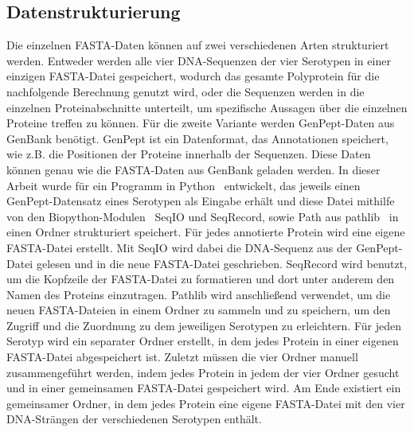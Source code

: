 \documentclass[german,version-2022-01]{uzl-thesis}
\begin{document}
\subsection{Datenstrukturierung}
Die einzelnen FASTA-Daten k\"onnen auf zwei verschiedenen Arten strukturiert werden. Entweder werden alle vier DNA-Sequenzen der vier Serotypen in einer einzigen FASTA-Datei gespeichert, wodurch das gesamte Polyprotein f\"ur die nachfolgende Berechnung genutzt wird, oder die Sequenzen werden in die einzelnen Proteinabschnitte unterteilt, um spezifische Aussagen \"uber die einzelnen Proteine treffen zu k\"onnen. F\"ur die zweite Variante werden GenPept-Daten aus GenBank ben\"otigt. GenPept ist ein Datenformat, das Annotationen speichert, wie z.B. die Positionen der Proteine innerhalb der Sequenzen. Diese Daten k\"onnen genau wie die FASTA-Daten aus GenBank geladen werden. In dieser Arbeit wurde f\"ur ein Programm in Python~\cite{python} entwickelt, das jeweils einen GenPept-Datensatz eines Serotypen als Eingabe erh\"alt und diese Datei mithilfe von den Biopython-Modulen~\cite{cock2009biopython} SeqIO und SeqRecord, sowie Path aus pathlib~\cite{pathlib} in einen Ordner strukturiert speichert. F\"ur jedes annotierte Protein wird eine eigene FASTA-Datei erstellt. Mit SeqIO wird dabei die DNA-Sequenz aus der GenPept-Datei gelesen und in die neue FASTA-Datei geschrieben. SeqRecord wird benutzt, um die Kopfzeile der FASTA-Datei zu formatieren und dort unter anderem den Namen des Proteins einzutragen. Pathlib wird anschlie\ss{}end verwendet, um die neuen FASTA-Dateien in einem Ordner zu sammeln und zu speichern, um den Zugriff und die Zuordnung zu dem jeweiligen Serotypen zu erleichtern. F\"ur jeden Serotyp wird ein separater Ordner erstellt, in dem jedes Protein in einer eigenen FASTA-Datei abgespeichert ist. Zuletzt m\"ussen die vier Ordner manuell zusammengef\"uhrt werden, indem jedes Protein in jedem der vier Ordner gesucht und in einer gemeinsamen FASTA-Datei gespeichert wird. Am Ende existiert ein gemeinsamer Ordner, in dem jedes Protein eine eigene FASTA-Datei mit den vier DNA-Str\"angen der verschiedenen Serotypen enth\"alt.
\end{document}
